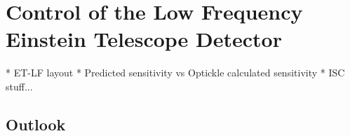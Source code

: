 \chapter{Control of the Low Frequency Einstein Telescope Detector}
\label{c:et-lf-control}

  * ET-LF layout
  * Predicted sensitivity vs Optickle calculated sensitivity
  * ISC stuff...

\section{Outlook}